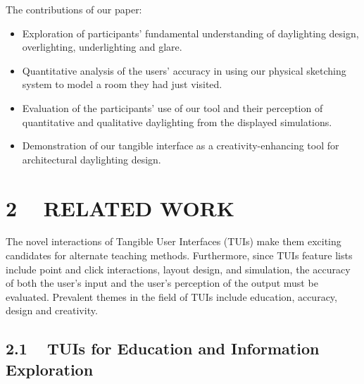 \documentclass{article}
\begin{document}
\noindent
The contributions of our paper: \vspace{-0.05in}

\begin{itemize}

\item Exploration of participants' fundamental understanding of
  daylighting design, overlighting, underlighting and glare.

\item Quantitative analysis of the users' accuracy in using our
  physical sketching system to model a room they had just visited.

\item Evaluation of the participants' use of our tool and their
  perception of quantitative and qualitative daylighting from the 
  displayed simulations.

\item Demonstration of our tangible interface as a
  creativity-enhancing tool for architectural daylighting design.

\end{itemize}



\section{2 ~ RELATED WORK}



The novel interactions of Tangible User Interfaces (TUIs) make them
exciting candidates for alternate teaching methods.  Furthermore,
since TUIs feature lists include point and click interactions, layout
design, and simulation, the accuracy of both the user's input and the
user's perception of the output must be evaluated.  Prevalent themes
in the field of TUIs include education, accuracy, design and creativity.

\subsection{2.1 ~ TUIs for Education and Information Exploration}
\end{document}
